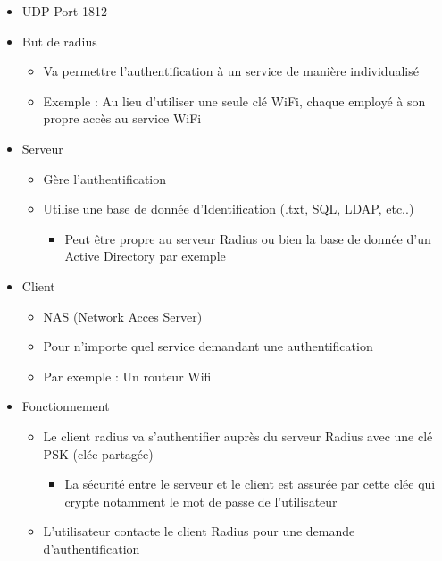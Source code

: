 \documentclass[a4paper]{article}
\begin{document}
      \begin{itemize}[label = \textbullet, font = \Large]
        \item UDP Port 1812
        \item But de radius
        \begin{itemize}[label=, font=\scriptsize]
          \item Va permettre l'authentification à un service de manière individualisé
          \item Exemple : Au lieu d'utiliser une seule clé WiFi, chaque employé à son propre accès au service WiFi
        \end{itemize}
        \item Serveur
        \begin{itemize}[label=, font=\scriptsize]
          \item Gère l'authentification
          \item Utilise une base de donnée d'Identification (.txt, SQL, LDAP, etc..)
          \begin{itemize}
            \item Peut être propre au serveur Radius ou bien la base de donnée d'un Active Directory par exemple
          \end{itemize}
        \end{itemize}
        \item Client
        \begin{itemize}[label=, font=\scriptsize]
          \item NAS (Network Acces Server)
          \item Pour n'importe quel service demandant une authentification
          \item Par exemple : Un routeur Wifi
        \end{itemize}
        \item Fonctionnement
        \begin{itemize}[label=, font=\scriptsize]
          \item Le client radius va s'authentifier auprès du serveur Radius avec une clé PSK (clée partagée)
          \begin{itemize}
            \item La sécurité entre le serveur et le client est assurée par cette clée qui crypte notamment le mot de passe de l'utilisateur
          \end{itemize}
          \item L'utilisateur contacte le client Radius pour une demande d'authentification

\end{itemize}
\end{itemize}
\end{document}
